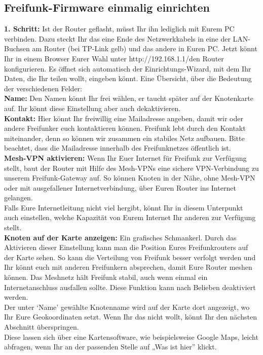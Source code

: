 \documentclass[10pt]{extarticle}
\begin{document}
\subsection*{Freifunk-Firmware einmalig einrichten}
\begin{multicols}{2}

\textbf{1. Schritt:} Ist der Router geflasht, müsst Ihr ihn lediglich mit Eurem PC verbinden. Dazu steckt Ihr das eine Ende des Netzwerkkabels in eine der LAN-Buchsen am Router (bei TP-Link gelb) und das andere in Euren PC. Jetzt könnt Ihr in einem Browser Eurer Wahl unter http://192.168.1.1/den Router konfigurieren. Es öffnet sich automatisch der Einrichtungs-Wizard, mit dem Ihr Daten, die Ihr teilen wollt, eingeben könnt. Eine Übersicht, über die Bedeutung der verschiedenen Felder:\\


\textbf{Name:} Den Namen könnt Ihr frei wählen, er taucht später auf der Knotenkarte auf. Ihr könnt diese Einstellung aber auch dekaktivieren.  \\

\textbf{Kontakt:} Hier könnt Ihr freiwillig eine Mailadresse angeben, damit wir oder andere Freifunker euch kontaktieren können. Freifunk lebt durch den Kontakt miteinander, denn so können wir zusammen ein stabiles Netz aufbauen. Bitte beachtet, dass die Mailadresse innerhalb des Freifunknetzes öffentlich ist.\\

\textbf{Mesh-VPN aktivieren:} Wenn Ihr Euer Internet für Freifunk zur Verfügung stellt, baut der Router mit Hilfe des Mesh-VPNs eine sichere VPN-Verbindung zu unserem Freifunk-Gateway auf. So können Knoten in der Nähe, ohne Mesh-VPN oder mit ausgefallener Internetverbindung, über Euren Router ins Internet gelangen.\\
Falls Eure Internetleitung nicht viel hergibt, könnt Ihr in diesem Unterpunkt auch einstellen, welche Kapazität von Eurem Internet Ihr anderen zur Verfügung stellt.\\

\columnbreak
\textbf{Knoten auf der Karte anzeigen:} Ein grafisches Schmankerl. Durch das Aktivieren dieser Einstellung kann man die Position Eures Freifunkrouters auf der Karte sehen. So kann die Verteilung von Freifunk besser verfolgt werden und Ihr könnt euch mit anderen Freifunkern absprechen, damit Eure Router meshen können. Das Meshnetz hält Freifunk stabil, auch wenn einmal ein Internetanschluss ausfallen sollte. Diese Funktion kann nach Belieben deaktiviert werden.\\
Der unter ‘Name’ gewählte Knotenname wird auf der Karte dort angezeigt, wo Ihr Eure Geokoordinaten setzt. Wenn Ihr das nicht wollt, könnt Ihr den nächsten Abschnitt überspringen.\\
Diese lassen sich über eine Kartensoftware, wie beispielsweise Google Maps, leicht abfragen, wenn Ihr an der passenden Stelle auf „Was ist hier” klickt.  \\


\end{multicols}
\end{document}
